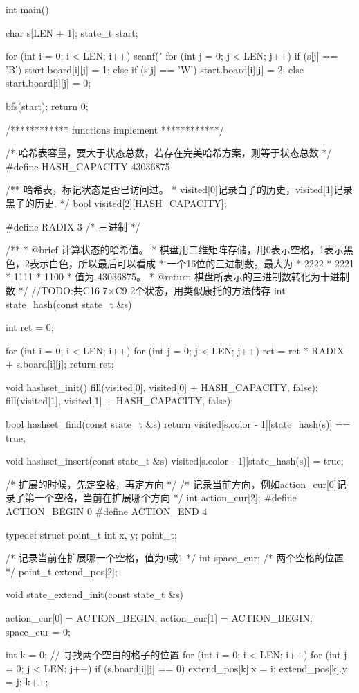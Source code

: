 \begin{Codex}[label=four_adjacent.cpp]
int main() {
    char s[LEN + 1];
    state_t start;

    for (int i = 0; i < LEN; i++) {
        scanf("%
        for (int j = 0; j < LEN; j++) {
            if (s[j] == 'B') start.board[i][j] = 1;
            else if (s[j] == 'W') start.board[i][j] = 2;
            else start.board[i][j] = 0;
        }
    }

    bfs(start);
    return 0;
}

/************ functions implement ************/

/* 哈希表容量，要大于状态总数，若存在完美哈希方案，则等于状态总数 */
#define HASH_CAPACITY 43036875

/** 哈希表，标记状态是否已访问过。
 * visited[0]记录白子的历史，visited[1]记录黑子的历史.
 */
bool visited[2][HASH_CAPACITY];

#define RADIX 3 /* 三进制 */

/**
 * @brief 计算状态的哈希值。
 * 棋盘用二维矩阵存储，用0表示空格，1表示黑色，2表示白色，所以最后可以看成
 * 一个16位的三进制数。最大为
 * 2222
 * 2221
 * 1111
 * 1100
 * 值为 43036875。
 * @return 棋盘所表示的三进制数转化为十进制数
 */
//TODO:共C16 7×C9 2个状态，用类似康托的方法储存
int state_hash(const state_t &s) {
    int ret = 0;

    for (int i = 0; i < LEN; i++) {
        for (int j = 0; j < LEN; j++) {
            ret = ret * RADIX + s.board[i][j];
        }
    }
    return ret;
}

void hashset_init() {
    fill(visited[0], visited[0] + HASH_CAPACITY, false);
    fill(visited[1], visited[1] + HASH_CAPACITY, false);
}

bool hashset_find(const state_t &s) {
    return visited[s.color - 1][state_hash(s)] == true;
}

void hashset_insert(const state_t &s) {
    visited[s.color - 1][state_hash(s)] = true;
}

/* 扩展的时候，先定空格，再定方向 */
/* 记录当前方向，例如action_cur[0]记录了第一个空格，当前在扩展哪个方向
 */
int action_cur[2];
#define ACTION_BEGIN 0
#define ACTION_END 4

typedef struct point_t {
    int x, y;
} point_t;

/* 记录当前在扩展哪一个空格，值为0或1 */
int space_cur;
/* 两个空格的位置 */
point_t extend_pos[2];

void state_extend_init(const state_t &s) {
    action_cur[0] = ACTION_BEGIN;
    action_cur[1] = ACTION_BEGIN;
    space_cur = 0;

    int k = 0;
    // 寻找两个空白的格子的位置
    for (int i = 0; i < LEN; i++) {
        for (int j = 0; j < LEN; j++) {
            if (s.board[i][j] == 0) {
                extend_pos[k].x = i;
                extend_pos[k].y = j;
                k++;
            }
        }
    }
}


\end{Codex}

